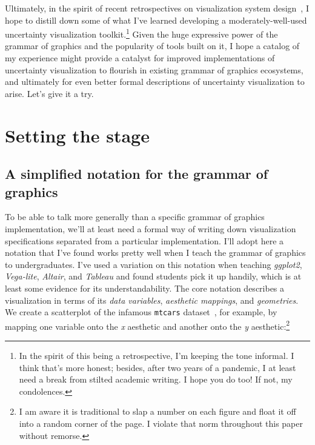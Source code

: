 \documentclass[journal]{vgtc}              %
\begin{document}
Ultimately, in the spirit of recent retrospectives on visualization system design~\cite{satyanarayan2019critical}, I hope to distill down some of what I've learned developing a moderately-well-used uncertainty visualization toolkit.\footnote{In the spirit of this being a retrospective, I'm keeping the tone informal. I think that's more honest; besides, after two years of a pandemic, I at least need a break from stilted academic writing. I hope you do too! If not, my condolences.} 
Given the huge expressive power of the grammar of graphics and the popularity of tools built on it, I hope a catalog of my experience might provide a catalyst for improved implementations of uncertainty visualization to flourish in existing grammar of graphics ecosystems, and ultimately for even better formal descriptions of uncertainty visualization to arise. Let's give it a try.

\section{Setting the stage}

\subsection{A simplified notation for the grammar of graphics}

To be able to talk more generally than a specific grammar of graphics implementation, we'll at least need a formal way of writing down visualization specifications separated from a particular implementation. I'll adopt here a notation that I've found works pretty well when I teach the grammar of graphics to undergraduates. I've used a variation on this notation when teaching \textit{ggplot2}, \textit{Vega-lite}, \textit{Altair}, and \textit{Tableau} and found students pick it up handily, which is at least some evidence for its understandability. The core notation describes a visualization in terms of its \textit{data variables}, \textit{aesthetic mappings}, and \textit{geometries}. We create a scatterplot of the infamous \texttt{mtcars} dataset~\cite{henderson1981building}, for example, by mapping one variable onto the \textit{x} aesthetic and another onto the \textit{y} aesthetic:\footnote{I am aware it is traditional to slap a number on each figure and float it off into a random corner of the page. I violate that norm throughout this paper without remorse.}
\end{document}

